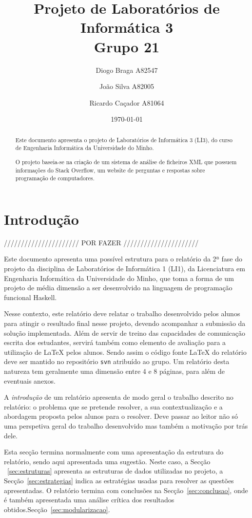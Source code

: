 \documentclass[a4paper]{article}
\title{Projeto de Laboratórios de Informática 3\\Grupo 21}
\author{Diogo Braga A82547 \and João Silva A82005 \and Ricardo Caçador A81064}
\date{\today}
\begin{document}
\maketitle

\begin{abstract}
  Este documento apresenta o projeto de Laboratórios de Informática
  3 (LI3), do curso de Engenharia Informática da Universidade
  do Minho.

  O projeto baseia-se na criação de um sistema de análise de ficheiros 
  XML que possuem informações do Stack Overflow, um website de perguntas
  e respostas sobre programação de computadores.

\end{abstract}

\tableofcontents
\listoffigures

\section{Introdução}
\label{sec:intro}

////////////////////// POR FAZER //////////////////////

Este documento apresenta uma possível estrutura para o relatório da 2ª
fase do projeto da disciplina de Laboratórios de Informática 1 (LI1),
da Licenciatura em Engenharia Informática da Universidade do Minho,
que toma a forma de um projeto de média dimensão a ser desenvolvido na
linguagem de programação funcional Haskell.

Nesse contexto, este relatório deve relatar o trabalho desenvolvido
pelos alunos para atingir o resultado final nesse projeto, devendo
acompanhar a submissão da solução implementada. Além de servir de
treino das capacidades de comunicação escrita dos estudantes, servirá
também como elemento de avaliação para a utilização de \LaTeX{} pelos
alunos. Sendo assim o código fonte \LaTeX{} do relatório deve ser
mantido no repositório \texttt{svn} atribuído ao grupo. Um relatório desta
natureza tem geralmente uma dimensão entre 4 e 8 páginas, para além de
eventuais anexos.

A \emph{introdução} de um relatório apresenta de modo geral o trabalho
descrito no relatório: o problema que se pretende resolver, a sua
contextualização e a abordagem proposta pelos alunos para o
resolver. Deve passar ao leitor não só uma perspetiva geral do
trabalho desenvolvido mas também a motivação por trás dele.

Esta secção termina normalmente com uma apresentação da estrutura do
relatório, sendo aqui apresentada uma sugestão. Neste caso, a Secção
~\ref{sec:estruturas} apresenta as estruturas de dados utilizadas 
no projeto, a Secção~\ref{sec:estrategias} indica as estratégias usadas 
para resolver as  questões apresentadas. O relatório termina com conclusões na
Secção~\ref{sec:conclusao}, onde é também apresentada uma análise
crítica dos resultados obtidos.Secção~\ref{sec:modularizacao}.
\end{document}
